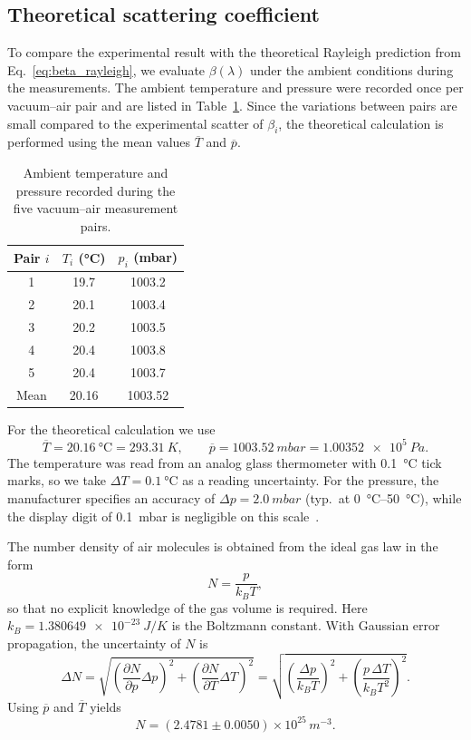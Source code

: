 \documentclass[a4paper]{article}
\begin{document}
\subsection{Theoretical scattering coefficient}
\label{sec:evaluation_beta_theory}

To compare the experimental result with the theoretical Rayleigh prediction from Eq.~\eqref{eq:beta_rayleigh}, we evaluate $\beta(\lambda)$ under the ambient conditions during the measurements.
The ambient temperature and pressure were recorded once per vacuum--air pair and are listed in Table~\ref{tab:temp_pressure}.
Since the variations between pairs are small compared to the experimental scatter of $\beta_i$, the theoretical calculation is performed using the mean values $\overline{T}$ and $\overline{p}$.

\vspace{1em}
\begin{table}[H]
\centering
\caption{Ambient temperature and pressure recorded during the five vacuum--air measurement pairs.}
\label{tab:temp_pressure}
\begin{tabular}{c c c}
\toprule
Pair $i$ & $T_i$ (\si{\celsius}) & $p_i$ (\si{mbar}) \\
\midrule
1 & 19.7 & 1003.2 \\
2 & 20.1 & 1003.4 \\
3 & 20.2 & 1003.5 \\
4 & 20.4 & 1003.8 \\
5 & 20.4 & 1003.7 \\
\midrule
Mean & 20.16 & 1003.52 \\
\bottomrule
\end{tabular}
\end{table}

For the theoretical calculation we use
\[
\overline{T}=\SI{20.16}{\celsius}=\SI{293.31}{K},\qquad \overline{p}=\SI{1003.52}{mbar}=\SI{1.00352e5}{Pa}.
\]
The temperature was read from an analog glass thermometer with \SI{0.1}{\celsius} tick marks, so we take $\Delta T=\SI{0.1}{\celsius}$ as a reading uncertainty.
For the pressure, the manufacturer specifies an accuracy of $\Delta p=\SI{2.0}{mbar}$ (typ.\ at \SIrange{0}{50}{\celsius}), while the display digit of \SI{0.1}{mbar} is negligible on this scale~\cite{GPB3300Manual}.

The number density of air molecules is obtained from the ideal gas law in the form
\[
N=\frac{p}{k_B T},
\]
so that no explicit knowledge of the gas volume is required.
Here $k_B=\SI{1.380649e-23}{J/K}$ is the Boltzmann constant.
With Gaussian error propagation, the uncertainty of $N$ is
\[
\Delta N=\sqrt{\left(\frac{\partial N}{\partial p}\Delta p\right)^2+\left(\frac{\partial N}{\partial T}\Delta T\right)^2}
=\sqrt{\left(\frac{\Delta p}{k_B T}\right)^2+\left(\frac{p\,\Delta T}{k_B T^{2}}\right)^2}.
\]
Using $\overline{p}$ and $\overline{T}$ yields
\[
N=(2.4781\pm 0.0050)\times 10^{25}\,\si{m^{-3}}.
\]
\end{document}
